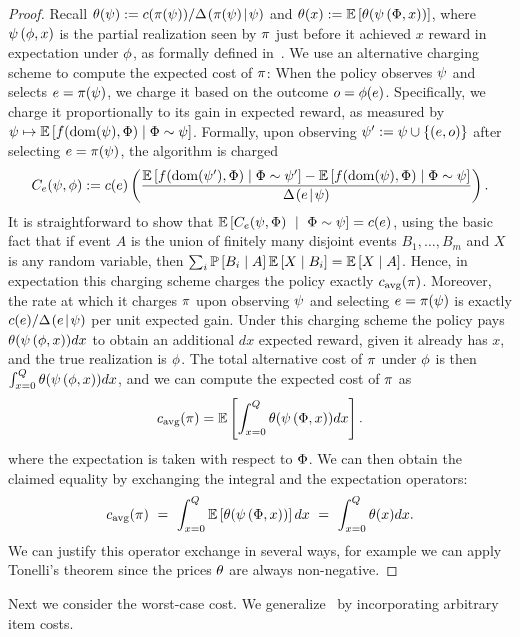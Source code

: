 \begin{proof}
Recall $\price(\prlz) := c(\policy(\prlz)) / \diff{\prlz}{\policy(\prlz)}$
and 
$\price(x) := \expctoverrlz{\rlz}{\price(\ptrace{\rvrlz}{x})}$, where
$\ptrace{\rlz}{x}$ is the partial realization seen by
$\policy$ just before it achieved $x$ reward in expectation under
$\rlz$, as formally defined in~.
We use an alternative charging scheme to compute the expected cost of
$\policy$: When the policy observes $\prlz$ and selects $e =
\policy(\prlz)$, we charge it based on the outcome $\outcome
= \rlz(e)$.  Specifically, we charge it proportionally to its gain in
expected reward, as measured by $\prlz \mapsto \progress{\prlz}$.  Formally, upon observing $\prlz' := \prlz \cup
\set{(e, \outcome)}$ after selecting $e =
\policy(\prlz)$, the algorithm is charged 
\begin{equation}
  \label{eq:charge-def}
%
%
  \charge{e}(\prlz, \rlz) := c(e) \paren{\frac{\progress{\prlz'} - \progress{\prlz}}{\diff{\prlz}{e}}}.
\end{equation}
%
%
It is straightforward to show that 
$\expct{\charge{e}(\prlz, \rvrlz) \ \mid \ \rvrlz \sim \prlz} = c(e)$,
using the basic fact that if event $A$ is the union of
finitely many disjoint events $B_1, \ldots, B_m$ and $X$ is any random
variable, then $\sum_i \prob{B_i \mid A} \expct{X \mid B_i} = \expct{X
\mid A}$.  Hence, in expectation this charging scheme charges the
policy exactly $\acst{\policy}$.  Moreover, the rate at which it charges
$\policy$ upon observing $\prlz$ and selecting $e = \policy(\prlz)$ is 
exactly $c(e) / \diff{\prlz}{e}$ per unit expected gain.  Under this
charging scheme the policy pays 
%
%
$\price(\ptrace{\rlz}{x}) dx$
to obtain an additional $dx$ expected reward, given it already has $x$, and the true
realization is $\rlz$.  The total alternative cost of $\policy$ under $\rlz$ is 
then $\int_{x=0}^{Q} \price(\ptrace{\rlz}{x}) dx$, and we can compute
the expected cost of $\policy$ as 
$$ \acst{\policy} = \expct{\int_{x=0}^{Q} \price(\ptrace{\rvrlz}{x})
  dx}. $$
where the expectation is taken with respect to $\rvrlz$.
We can then obtain the claimed equality by exchanging the integral and the expectation operators:
$$\acst{\policy} \ = \  \int_{x=0}^{Q}
\expct{\price(\ptrace{\rvrlz}{x})} dx \ = \ \int_{x=0}^{Q} \price(x)
dx.$$ 
We can justify this operator exchange in several ways, for example we can apply Tonelli's theorem since the prices $\price$ are always non-negative.
\end{proof}


\noindent
Next we consider the worst-case cost.
%
We generalize~ by 
incorporating arbitrary item costs.


